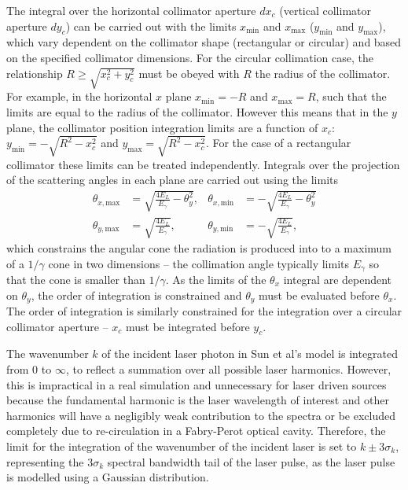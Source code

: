 \documentclass[../main.tex]{subfiles}
\begin{document}
The integral over the horizontal collimator aperture $dx_{c}$ (vertical collimator aperture $dy_{c}$) can be carried out with the limits $x_{\mathrm{min}}$ and $x_{\mathrm{max}}$ ($y_{\mathrm{min}}$ and $y_{\mathrm{max}}$), which vary dependent on the collimator shape (rectangular or circular) and based on the specified collimator dimensions. For the circular collimation case, the relationship $R\geq\sqrt{x_{c}^{2}+y_{c}^{2}}$ must be obeyed with $R$ the radius of the collimator. For example, in the horizontal $x$ plane $x_{\mathrm{min}} = -R$ and $x_{\mathrm{max}} = R$, such that the limits are equal to the radius of the collimator. However this means that in the $y$ plane, the collimator position integration limits are a function of $x_{c}$: $y_{\mathrm{min}} = -\sqrt{R^{2}-x_{c}^{2}}$ and $y_{\mathrm{max}} = \sqrt{R^{2}-x_{c}^{2}}$. For the case of a rectangular collimator these limits can be treated independently.  
Integrals over the projection of the scattering angles in each plane are carried out using the limits
\begin{align}
\theta_{x,\mathrm{max}} &= \sqrt{\frac{4E_{L}}{E_{\gamma}}-\theta_{y}^{2}}, & \theta_{x,\mathrm{min}} &= -\sqrt{\frac{4E_{L}}{E_{\gamma}}-\theta_{y}^{2}} \nonumber\\ 
\theta_{y,\mathrm{max}} &= \sqrt{\frac{4E_{L}}{E_{\gamma}}}, & \theta_{y,\mathrm{min}} &= -\sqrt{\frac{4E_{L}}{E_{\gamma}}},  
\end{align}
which constrains the angular cone the radiation is produced into to a maximum of a $1/\gamma$ cone in two dimensions -- the collimation angle typically limits $E_{\gamma}$ so that the cone is smaller than $1/\gamma$. As the limits of the $\theta_{x}$ integral are dependent on $\theta_{y}$, the order of integration is constrained and $\theta_{y}$ must be evaluated before $\theta_{x}$. The order of integration is similarly constrained for the integration over a circular collimator aperture -- $x_{c}$ must be integrated before $y_{c}$.

The wavenumber $k$ of the incident laser photon in Sun et al's model \cite{sun2009characterizations,sun2011theoretical} is integrated from $0$ to $\infty$, to reflect a summation over all possible laser harmonics. However, this is impractical in a real simulation and unnecessary for laser driven sources because the fundamental harmonic is the laser wavelength of interest and other harmonics will have a negligibly weak contribution to the spectra or be excluded completely due to re-circulation in a Fabry-Perot optical cavity. Therefore, the limit for the integration of the wavenumber of the incident laser is set to $k\pm3\sigma_{k}$, representing the 3$\sigma_{k}$ spectral bandwidth tail of the laser pulse, as the laser pulse is modelled using a Gaussian distribution.  
\end{document}
